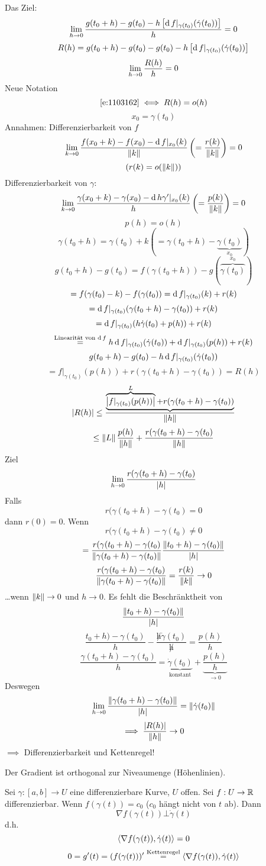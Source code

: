 \begin{Bew}
  Das Ziel:
  \[\displaystyle\lim_{h\rightarrow0} \frac{g(t_0+h)-g(t_0)-h\left[ \operatorname{d} f|_{\gamma(t_0)}(\dot\gamma(t_0)) \right]}{h}=0\]
  \begin{equation}
    \label{e:1103161}
    R(h)=g(t_0+h)-g(t_0)-g(t_0)-h\left[ \operatorname{d} f|_{\gamma(t_0)}(\dot\gamma(t_0)) \right]
  \end{equation}
  \begin{equation}
    \label{e:1103162}
    \displaystyle\lim_{h\rightarrow0}\frac{R(h)}{h}=0
  \end{equation}
  Neue Notation
  \[\ref{e:1103162}\iff R(h)=o(h)\]
  \[x_0=\gamma(t_0)\]
  Annahmen: Differenzierbarkeit von $f$
  \[\displaystyle\lim_{k\rightarrow0}\frac{f(x_0+k)-f(x_0)-\operatorname{d} f|_{x_0}(k)}{\left\| k \right\|}\left( =\frac{r(k)}{\left\| k \right\|} \right)=0\]
  \[\left( r(k)=o(\left\| k \right\|) \right)\]
  Differenzierbarkeit von $\gamma$:
  \[\displaystyle\lim_{k\rightarrow0}\frac{\gamma(x_0+k)-\gamma(x_0)-\operatorname{d} h\gamma'|_{x_0}(k)}{h}\left( =\frac{p(k)}{\left\| k \right\|} \right)=0\]
  \[p(h)=o(h)\]
  \[\gamma(t_0+h)=\gamma(t_0)+k\left( =\gamma(t_0+h)-\underbrace{\gamma(t_0)}_{x_0} \right)\]
  \[g(t_0+h)-g(t_0)=f(\gamma(t_0+h))-g(\overbrace{\gamma(t_0)}^{x_0})\]
  \[=f(\gamma(t_0)-k)-f(\gamma(t_0))=\operatorname{d} f|_{\gamma(t_0)}(k)+r(k)\]
  \[=\operatorname{d} f|_{\gamma(t_0)}(\gamma(t_0+h)-\gamma(t_0))+r(k)\]
  \[=\operatorname{d} f|_{\gamma(t_0)}(h\dot\gamma(t_0)+p(h))+r(k)\]
  \[\stackrel{\text{Linearität von $\operatorname{d} f$}}{=}h\operatorname{d} f|_{\gamma(t_0)}(\dot\gamma(t_0))+\operatorname{d} f|_{\gamma(t_0)}(p(h))+r(k)\]
  \[g(t_0+h)-g(t_0)-h\operatorname{d} f|_{\gamma(t_0)}(\dot\gamma(t_0))\]
  \[=f|_{\gamma(t_0)}(p(h))+r(\gamma(t_0+h)-\gamma(t_0))=R(h)\]
  \[\left| R(h) \right|\leq \frac{\underbrace{\overbrace{\left| f|_{\gamma(t_0)}(p(h)) \right|}^{L}+r(\gamma(t_0+h)-\gamma(t_0))}}{\left\| h \right\|}\]
  \[\leq\left\| L \right\|\frac{p(h)}{\left\| h \right\|}+\frac{r(\gamma(t_0+h)-\gamma(t_0)}{\left\| h \right\|}\]
  Ziel
  \[\displaystyle\lim_{h\rightarrow0}\frac{r(\gamma(t_0+h)-\gamma(t_0)}{\left| h \right|}\]
  Falls 
  \[r(\gamma(t_0+h)-\gamma(t_0)=0\]
  dann $r(0)=0$. Wenn 
  \[r(\gamma(t_0+h)-\gamma(t_0)\neq 0\]
  \[=\frac{r(\gamma(t_0+h)-\gamma(t_0)}{\left\| \gamma(t_0+h)-\gamma(t_0) \right\|}\frac{\left\| t_0+h)-\gamma(t_0) \right\|}{\left| h \right|}\]
  \[\frac{r(\gamma(t_0+h)-\gamma(t_0)}{\left\| \gamma(t_0+h)-\gamma(t_0) \right\|}=\frac{r(k)}{\left\| k \right\|}\rightarrow 0\]
  \ldots wenn $\left\| k \right\|\rightarrow 0$ und $h\to 0$. Es fehlt die Beschränktheit von
  \[\frac{\left\| t_0+h)-\gamma(t_0) \right\|}{\left| h \right|}\]
  \[\frac{t_0+h)-\gamma(t_0)}{h}-\frac{\not h\dot \gamma(t_0)}{\not h}=\frac{p(h)}{h}\]
  \[\frac{\gamma(t_0+h)-\gamma(t_0)}{h}=\underbrace{\dot\gamma(t_0)}_{\text{konstant}}+\underbrace{\frac{p(h)}{h}}_{\to 0}\]
  Deswegen
  \[\displaystyle\lim_{h\rightarrow0}\frac{\left\| \gamma(t_0+h)-\gamma(t_0) \right\|}{\left| h \right|}=\left\| \dot\gamma(t_0) \right\|\]
  \[\implies \frac{\left| R(h) \right|}{\left\| h \right\|}\rightarrow 0\]
  $\implies$ Differenzierbarkeit und Kettenregel!
\end{Bew}
\begin{Bem}
  Der Gradient ist orthogonal zur Niveaumenge (Höhenlinien).
\end{Bem}
\begin{Def}
  Sei $\gamma:[a,b]\to U$ eine differenzierbare Kurve, $U$ offen. Sei $f:U\rightarrow\mathbb{R}$ differenzierbar. Wenn $f(\gamma(t))=c_0$ ($c_0$ hängt nicht von $t$ ab). Dann
  \[\nabla f(\gamma(t))\bot \dot\gamma(t)\]
  d.h.
  \[\langle \nabla f(\gamma(t)), \dot\gamma(t)  \rangle=0\]
  \[0=g'(t)=(f(\gamma(t)))'\stackrel{\text{Kettenregel}}{=}\langle \nabla f(\gamma(t)), \dot\gamma(t) \rangle\]
\end{Def}
